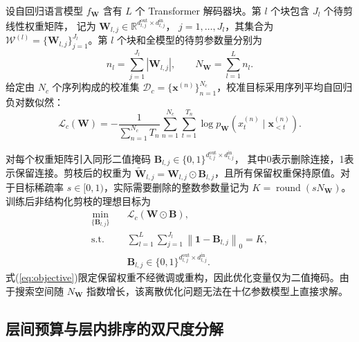 \documentclass[UTF8,fontset=fandol]{ctexart}
\begin{document}
设自回归语言模型 $f_{\bm W}$ 含有 $L$ 个 Transformer 解码器块。第 $l$ 个块包含 $J_l$ 个待剪线性权重矩阵，
记为
$\bm W_{l,j}\in\mathbb R^{d_{l,j}^{\mathrm{out}}\times d_{l,j}^{\mathrm{in}}}$，
$j=1,\ldots,J_l$，其集合为
$\mathcal W^{(l)}=\{\bm W_{l,j}\}_{j=1}^{J_l}$。第 $l$ 个块和全模型的待剪参数量分别为
\begin{equation}
n_l=\sum_{j=1}^{J_l}\left|\bm W_{l,j}\right|,
\qquad
N_{\bm W}=\sum_{l=1}^{L}n_l .
\label{eq:parameter_count}
\end{equation}
给定由 $N_c$ 个序列构成的校准集
$\mathcal D_c=\{\bm x^{(n)}\}_{n=1}^{N_c}$，校准目标采用序列平均自回归负对数似然：
\begin{equation}
\mathcal L_c(\bm W)
=
-\frac{1}{\sum_{n=1}^{N_c}T_n}
\sum_{n=1}^{N_c}\sum_{t=1}^{T_n}
\log p_{\bm W}\!\left(x_t^{(n)}\mid \bm x_{<t}^{(n)}\right).
\label{eq:calibration_loss}
\end{equation}

对每个权重矩阵引入同形二值掩码
$\bm B_{l,j}\in\{0,1\}^{d_{l,j}^{\mathrm{out}}\times d_{l,j}^{\mathrm{in}}}$，
其中0表示删除连接，1表示保留连接。剪枝后的权重为
$\widetilde{\bm W}_{l,j}=\bm W_{l,j}\odot\bm B_{l,j}$，且所有保留权重保持原值。对于目标稀疏率
$s\in[0,1)$，实际需要删除的整数参数量记为
$K=\operatorname{round}(sN_{\bm W})$。训练后非结构化剪枝的理想目标为
\begin{equation}
\begin{aligned}
\min_{\{\bm B_{l,j}\}}\quad&
\mathcal L_c(\bm W\odot\bm B),\\
\mathrm{s.t.}\quad&
\sum_{l=1}^{L}\sum_{j=1}^{J_l}
\left\|\bm 1-\bm B_{l,j}\right\|_0=K,\\
&\bm B_{l,j}\in\{0,1\}^{d_{l,j}^{\mathrm{out}}\times d_{l,j}^{\mathrm{in}}}.
\end{aligned}
\label{eq:objective}
\end{equation}
式(\ref{eq:objective})限定保留权重不经微调或重构，因此优化变量仅为二值掩码。由于搜索空间随
$N_{\bm W}$ 指数增长，该离散优化问题无法在十亿参数模型上直接求解。

\subsection{层间预算与层内排序的双尺度分解}
\end{document}
